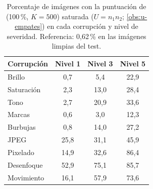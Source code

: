 \begin{table}
\centering
\footnotesize
\setlength{\tabcolsep}{6pt}
\caption{Porcentaje de imágenes con la puntuación de \stoodx (100\,\%, $K=500$) saturada ($U=n_1n_2$; \cref{obs:u-empates}) en cada corrupción y nivel de severidad. Referencia: 0{,}62\,\% en las imágenes limpias del test.}
\label{tab:ood-corr-saturacion}
\begin{tabular*}{\linewidth}{@{\extracolsep{\fill}}lccc}
\toprule
Corrupción & Nivel 1 & Nivel 3 & Nivel 5 \\
\midrule
Brillo & 0{,}7 & 5{,}4 & 22{,}9 \\
Saturación & 2{,}3 & 13{,}0 & 28{,}4 \\
Tono & 2{,}7 & 20{,}9 & 33{,}6 \\
Marcas & 0{,}6 & 3{,}0 & 12{,}3 \\
Burbujas & 0{,}8 & 14{,}0 & 27{,}2 \\
JPEG & 25{,}8 & 31{,}1 & 45{,}9 \\
Pixelado & 14{,}9 & 32{,}6 & 86{,}4 \\
Desenfoque & 52{,}9 & 75{,}1 & 85{,}7 \\
Movimiento & 16{,}1 & 57{,}9 & 73{,}6 \\
\bottomrule
\end{tabular*}
\end{table}
